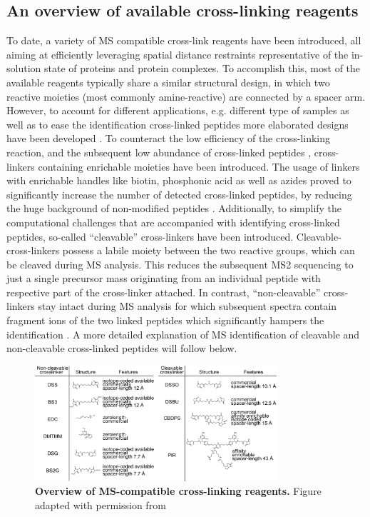 \subsection*{An overview of available cross-linking reagents}
To date, a variety of MS compatible cross-link reagents have been introduced, all aiming at efficiently leveraging spatial distance restraints representative of the in-solution state of proteins and protein complexes. To accomplish this, most of the available reagents typically share a similar structural design, in which two reactive moieties (most commonly amine-reactive) are connected by a spacer arm. However, to account for different applications, e.g. different type of samples as well as to ease the identification cross-linked peptides more elaborated designs have been developed \cite{Steigenberger_2020}. To counteract the low efficiency of the cross-linking reaction, and the subsequent low abundance of cross-linked peptides \cite{Leitner_2014, Leitner_2010}, cross-linkers containing enrichable moieties have been introduced. The usage of linkers with enrichable handles like biotin, phosphonic acid as well as azides proved to significantly increase the number of detected cross-linked peptides, by reducing the huge background of non-modified peptides \cite{Matzinger_2020, Steigenberger_2019, Tan_2016}. Additionally, to simplify the computational challenges that are accompanied with identifying cross-linked peptides, so-called “cleavable” cross-linkers have been introduced. Cleavable-cross-linkers possess a labile moiety between the two reactive groups, which can be cleaved during MS analysis. This reduces the subsequent MS2 sequencing to just a single precursor mass originating from an individual peptide with respective part of the cross-linker attached. In contrast, “non-cleavable” cross-linkers stay intact during MS analysis for which subsequent spectra contain fragment ions of the two linked peptides which significantly hampers the identification \cite{Kao_2011}. A more detailed explanation of MS identification of cleavable and non-cleavable cross-linked peptides will follow below.

\begin{figure}[hbt!]
    \center
    \includegraphics[width=0.8\textwidth]{Chapter.1/Figures/Figure2.png} 
    \caption{\textbf{Overview of MS-compatible cross-linking reagents.} Figure adapted with permission from \cite{Steigenberger_2020}}
    \label{fig:fig2}
\end{figure}


